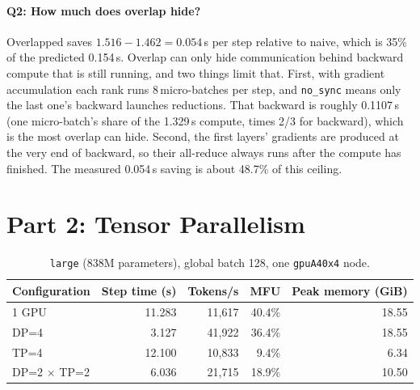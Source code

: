 \documentclass[10pt]{article}
\begin{document}
\paragraph{Q2: How much does overlap hide?}
Overlapped saves $1.516 - 1.462 = 0.054$\,s per step relative to naive,
which is 35\% of the predicted 0.154\,s. 
Overlap can only hide communication behind backward compute that is still
running, and two things limit that. First, with gradient accumulation each
rank runs 8\,micro-batches per step, and \texttt{no\_sync} means only
the last one's backward launches reductions. That backward is roughly
0.1107\,s (one micro-batch's share of the 1.329\,s compute, times 2/3 for
backward), which is the most overlap can hide. Second, the first layers'
gradients are produced at the very end of backward, so their all-reduce
always runs after the compute has finished. The measured 0.054\,s saving is
about 48.7\% of this ceiling.

\section{Part 2: Tensor Parallelism}


\begin{table}[htbp]
\caption{\texttt{large} (838M parameters), global batch 128, one
\texttt{gpuA40x4} node.}
\label{tab:tp}
\centering
\begin{tabular}{lrrrr}
\toprule
Configuration & Step time (s) & Tokens/s & MFU & Peak memory (GiB) \\
\midrule
1 GPU          & 11.283 & 11{,}617 & 40.4\% & 18.55 \\
DP=4           & 3.127  & 41{,}922 & 36.4\% & 18.55 \\
TP=4           & 12.100 & 10{,}833 & 9.4\%  & 6.34  \\
DP=2 $\times$ TP=2 & 6.036 & 21{,}715 & 18.9\% & 10.50 \\
\bottomrule
\end{tabular}
\end{table}
\end{document}
